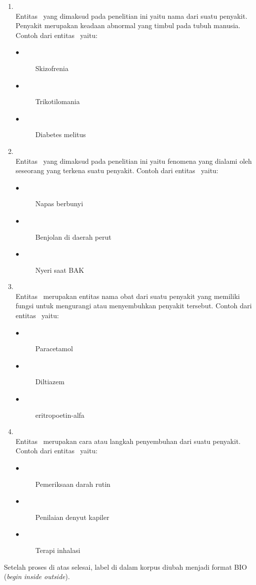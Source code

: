 \begin{enumerate}
	\item \Disease\\
	Entitas \disease~yang dimaksud pada penelitian ini yaitu nama dari suatu penyakit. Penyakit merupakan keadaan abnormal yang timbul pada tubuh manusia. Contoh dari entitas \disease~yaitu:
	\begin{description}
		\item[$\bullet$] Skizofrenia
		\item[$\bullet$] Trikotilomania
		\item[$\bullet$] Diabetes melitus
	\end{description}

	\item \Symptom\\
	Entitas \symptom~yang dimaksud pada penelitian ini yaitu fenomena yang dialami oleh seseorang yang terkena suatu penyakit. Contoh dari entitas \symptom~yaitu:
	\begin{description}
		\item[$\bullet$] Napas berbunyi
		\item[$\bullet$] Benjolan di daerah perut
		\item[$\bullet$] Nyeri saat BAK
	\end{description}

	\item \Drug\\
	Entitas \drug~merupakan entitas nama obat dari suatu penyakit yang memiliki fungsi untuk mengurangi atau menyembuhkan penyakit tersebut. Contoh dari entitas \drug~yaitu:
	\begin{description}
		\item[$\bullet$] Paracetamol
		\item[$\bullet$] Diltiazem
		\item[$\bullet$] eritropoetin-alfa
	\end{description}

	\item \Treatment\\
	Entitas \treatment~merupakan cara atau langkah penyembuhan dari suatu penyakit. Contoh dari entitas \treatment~yaitu:
	\begin{description}
		\item[$\bullet$] Pemeriksaan darah rutin
		\item[$\bullet$] Penilaian denyut kapiler
		\item[$\bullet$] Terapi inhalasi
	\end{description}
\end{enumerate}
Setelah proses di atas selesai, label di dalam korpus diubah menjadi format BIO (\textit{begin inside outside}).

